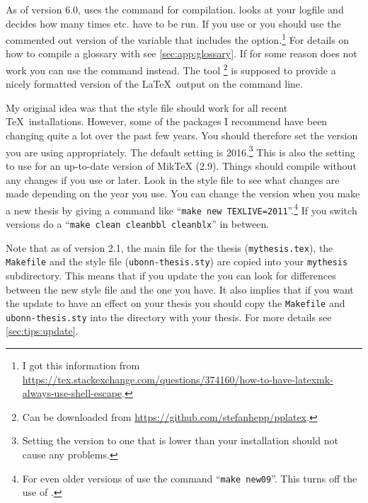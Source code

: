 As of version 6.0,  uses the  command for compilation.
 looks at your logfile and decides how many times  etc.
have to be run.
If you use  or  you should use the commented out version
of the  variable that includes the  option.\footnote{%
  I got this information from \url{https://tex.stackexchange.com/questions/374160/how-to-have-latexmk-always-use-shell-escape}.}
For details on how to compile a glossary with  see \cref{sec:app:glossary}.
If for some reason  does not work you can use the command
 instead.
The tool \footnote{%
Can be downloaded from \url{https://github.com/stefanhepp/pplatex}.
}
is supposed to provide a nicely formatted version of the \LaTeX\ output on the command line.

My original idea was that the style file should work for all recent
\TeX\ installations.  However, some of the packages I recommend have
been changing quite a lot over the past few years.
You should therefore set the \TeXLive version you are using appropriately.
The default setting is 2016.\footnote{%
Setting the \TeXLive version to one that is lower than your installation should not cause any problems.}
This is also the setting to use for an up-to-date version of MikTeX (2.9).
Things should compile without any changes if you use  or later.
Look in the style file to see what changes are made depending on the year you use.
You can change the \TeXLive version when you make a new thesis
by giving a command like \enquote{\texttt{make new TEXLIVE=2011}}.\footnote{%
For even older versions of \TeXLive use the command \enquote{\texttt{make new09}}.
This turns off the use of .}
If you switch \TeXLive versions do a
\enquote{\texttt{make clean cleanbbl cleanblx}} in between.

Note that as of version 2.1, the main file for the thesis
(\texttt{mythesis.tex}), the \texttt{Makefile} and the style file
(\texttt{ubonn-thesis.sty}) are copied into your \texttt{mythesis}
subdirectory. This means that if you update the 
you can look for differences between the new style file and the one
you have. It also implies that if you want the update to have an
effect on your thesis you should copy the \texttt{Makefile} and
\texttt{ubonn-thesis.sty} into the directory with your thesis.
For more details see \cref{sec:tips:update}.

